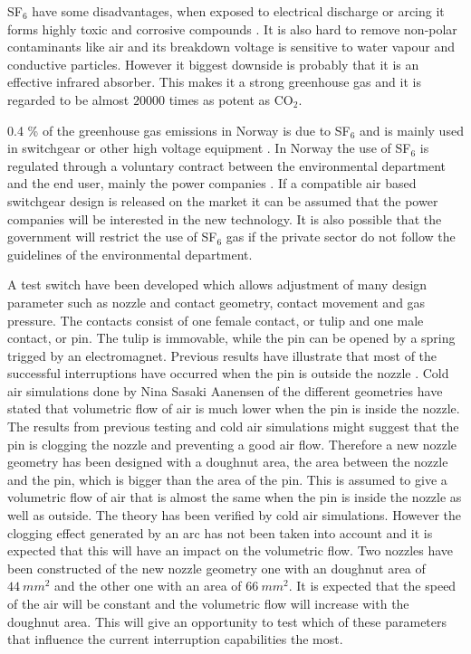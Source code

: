 \documentclass[10pt,a4paper]{article} %
\begin{document}
SF$_6$ have some disadvantages, when exposed to electrical discharge or arcing it forms highly toxic and corrosive compounds \cite{bib:SF6PI}. It is also hard to remove non-polar contaminants like air and its breakdown voltage is sensitive to water vapour and conductive particles. However it biggest downside is probably that it is an effective infrared absorber. This makes it a strong greenhouse gas \cite{bib:SF6PI} and it is regarded to be almost $20000$ times as potent as CO$_2$.

0.4 \% of the greenhouse gas emissions in Norway is due to SF$_6$ and is mainly used in switchgear or other high voltage equipment \cite{bib:KlimaKur2020}. In Norway the use of SF$_6$ is regulated through a voluntary contract between the environmental department and the end user, mainly the power companies \cite{bib:KlimaKur2020}. If a compatible air based switchgear design is released on the market it can be assumed that the power companies will be interested in the new technology. It is also possible that the government will restrict the use of SF$_6$ gas if the private sector do not follow the guidelines of the environmental department.

A test switch have been developed which allows adjustment of many design parameter such as nozzle and contact geometry, contact movement and gas pressure. The contacts consist of one female contact, or tulip and one male contact, or pin. The tulip is immovable, while the pin can be opened by a spring trigged by an electromagnet. Previous results have illustrate that most of the successful interruptions have occurred when the pin is outside the nozzle \cite{bib:CIAMVLBS}. Cold air simulations done by Nina Sasaki Aanensen of the different geometries have stated that volumetric flow of air is much lower when the pin is inside the nozzle. The results from previous testing and cold air simulations might suggest that the pin is clogging the nozzle and preventing a good air flow. Therefore a new nozzle geometry has been designed with a doughnut area, the area between the nozzle and the pin, which is bigger than the area of the pin. This is assumed to give a volumetric flow of air that is almost the same when the pin is inside the nozzle as well as outside. The theory has been verified by cold air simulations. However the clogging effect generated by an arc has not been taken into account and it is expected that this will have an impact on the volumetric flow. Two nozzles have been constructed of the new nozzle geometry one with an doughnut area of $44 \ mm^2$ and the other one with an area of $66 \ mm^2$. It is expected that the speed of the air will be constant and the volumetric flow will increase with the doughnut area. This will give an opportunity to test which of these parameters that influence the current interruption capabilities the most.
\end{document}
